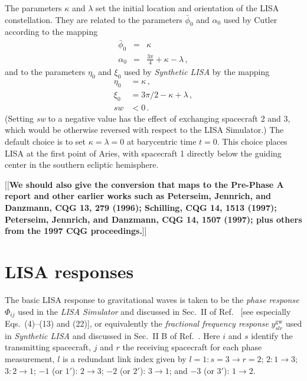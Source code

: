 \documentclass[11pt]{report}
\begin{document}
The parameters $\kappa$ and $\lambda$ set the initial location and orientation of the
LISA constellation. They are related to the parameters $\bar{\phi}_0$ and $\alpha_0$
used by Cutler~\cite{cutler98} according to the mapping
%
\begin{eqnarray}
\bar{\phi}_0 &=& \kappa \nonumber \\
\alpha_0 & = & \frac{3 \pi}{4} + \kappa -\lambda \, ,
\end{eqnarray}
%
and to the parameters $\eta_0$ and $\xi_0$ used by \emph{Synthetic LISA} \cite{synthlisa,vallis2005}
by the mapping
%
\begin{equation}
\begin{aligned}
\eta_0 &= \kappa \,,  \nonumber \\
\xi_0 &= 3 \pi / 2 - \kappa + \lambda \,, \\
\mathit{sw} &< 0 \, .
\end{aligned}
\end{equation}
%
(Setting \textit{sw} to a negative value has the effect of exchanging spacecraft 2 and 3, which
would be otherwise reversed with respect to the LISA Simulator.)
The default choice is to set $\kappa=\lambda=0$ at barycentric time $t=0$. This choice places LISA at the
first point of Aries, with spacecraft 1 directly below the guiding center in the southern
ecliptic hemisphere.

[[{\bf We should also give the conversion that maps to the Pre-Phase A report and other earlier works
such as Peterseim, Jennrich, and Danzmann, CQG 13, 279 (1996); Schilling, CQG 14, 1513 (1997);
Peterseim, Jennrich, and Danzmann, CQG 14, 1507 (1997); plus others from the 1997 CQG proceedings.}]]


\section{LISA responses}
\label{sec:responses}

The basic LISA response to gravitational waves is taken to be the \emph{phase response} $\Phi_{ij}$ used in the
\emph{LISA Simulator} and discussed in Sec.\ II of Ref.\ \cite{cr2003} [see especially Eqs.\ (4)--(13) and (22)],
or equivalently the \emph{fractional frequency response} $y^\mathrm{gw}_{slr}$ used in \emph{Synthetic LISA} and
discussed in Sec.\ II B of Ref.\ \cite{vallis2005}. Here $i$ and $s$ identify the transmitting spacecraft, $j$
and $r$ the receiving spacecraft for each phase measurement, $l$ is a redundant link index given by
$l= 1: s = 3 \rightarrow r = 2$; 
$2: 1 \rightarrow 3$;
$3: 2 \rightarrow 1$;
$-1$ (or $1'$): $2 \rightarrow 3$;
$-2$ (or $2'$): $3 \rightarrow 1$; and
$-3$ (or $3'$): $1 \rightarrow 2$.
\end{document}
